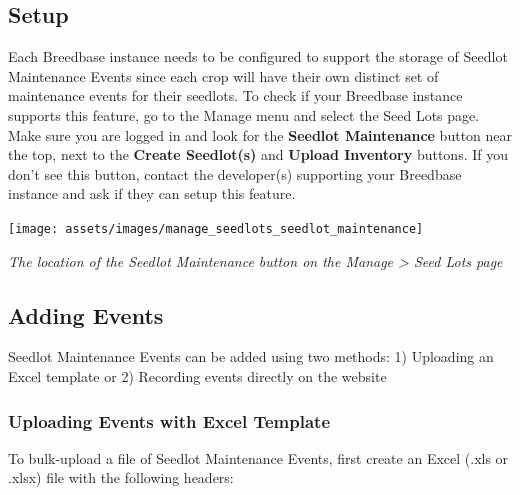 \documentclass[
  12pt,
]{book}
\begin{document}
\hypertarget{setup}{%
\subsection{Setup}\label{setup}}

Each Breedbase instance needs to be configured to support the storage of Seedlot Maintenance Events since each crop will have their own distinct set of maintenance events for their seedlots. To check if your Breedbase instance supports this feature, go to the Manage menu and select the Seed Lots page. Make sure you are logged in and look for the \textbf{Seedlot Maintenance} button near the top, next to the \textbf{Create Seedlot(s)} and \textbf{Upload Inventory} buttons. If you don't see this button, contact the developer(s) supporting your Breedbase instance and ask if they can setup this feature.

\begin{center}\texttt{[image: assets/images/manage\_seedlots\_seedlot\_maintenance]} \end{center}

\emph{The location of the Seedlot Maintenance button on the Manage \textgreater{} Seed Lots page}

\hypertarget{adding-events}{%
\subsection{Adding Events}\label{adding-events}}

Seedlot Maintenance Events can be added using two methods: 1) Uploading an Excel template or 2) Recording events directly on the website

\hypertarget{uploading-events-with-excel-template}{%
\subsubsection*{Uploading Events with Excel Template}\label{uploading-events-with-excel-template}}


To bulk-upload a file of Seedlot Maintenance Events, first create an Excel (.xls or .xlsx) file with the following headers:
\end{document}
